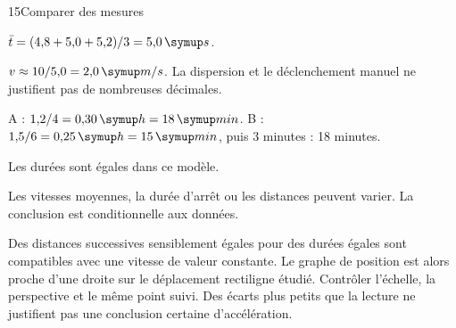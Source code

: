 \par\noindent\begin{minipage}{\linewidth}
\begin{corrige}{15}{Comparer des mesures}
\begin{questions}
\item $\bar t=(4{,}8+5{,}0+5{,}2)/3=5{,}0\unite s$.
\item $v\approx10/5{,}0=2{,}0\unite{m/s}$. La dispersion et le déclenchement manuel ne justifient pas de nombreuses décimales.
\end{questions}
\end{corrige}
\end{minipage}
\par\noindent\begin{minipage}{\linewidth}
\label{cor-defi-8}\begin{questions}
\item A : $1{,}2/4=0{,}30\unite h=18\unite{min}$. B : $1{,}5/6=0{,}25\unite h=15\unite{min}$, puis 3 minutes : 18 minutes.
\item Les durées sont égales dans ce modèle.
\item Les vitesses moyennes, la durée d’arrêt ou les distances peuvent varier. La conclusion est conditionnelle aux données.
\end{questions}
\end{minipage}
\par\noindent\begin{minipage}{\linewidth}
\label{cor-activite-8}
Des distances successives sensiblement égales pour des durées égales sont compatibles avec une vitesse de valeur constante. Le graphe de position est alors proche d’une droite sur le déplacement rectiligne étudié. Contrôler l’échelle, la perspective et le même point suivi. Des écarts plus petits que la lecture ne justifient pas une conclusion certaine d’accélération.\par\end{minipage}
